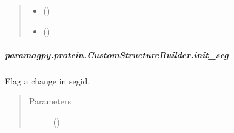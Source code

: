 \documentclass[a4paper,10pt,english,openany,oneside]{sphinxmanual}
\begin{document}
\begin{fulllineitems}
\begin{fulllineitems}
\begin{fulllineitems}
\begin{quote}
\begin{description}
\begin{itemize}
\item {} 
\sphinxAtStartPar
{} (\sphinxstyleliteralemphasis{\sphinxupquote{, }}) \textendash{} 

\item {} 
\sphinxAtStartPar
{} (\sphinxstyleliteralemphasis{\sphinxupquote{, }}) \textendash{} 

\end{itemize}

\end{description}\end{quote}

\end{fulllineitems}



\subparagraph{paramagpy.protein.CustomStructureBuilder.init\_seg}
\label{\detokenize{reference/generated/paramagpy.protein.CustomStructureBuilder.init_seg:paramagpy-protein-customstructurebuilder-init-seg}}\label{\detokenize{reference/generated/paramagpy.protein.CustomStructureBuilder.init_seg::doc}}

\begin{fulllineitems}
\label{\detokenize{reference/generated/paramagpy.protein.CustomStructureBuilder.init_seg:paramagpy.protein.CustomStructureBuilder.init_seg}}
\sphinxAtStartPar
Flag a change in segid.
\begin{quote}\begin{description}
\item[{Parameters}] \leavevmode
\sphinxAtStartPar
{} () \textendash{} 

\end{description}\end{quote}

\end{fulllineitems}




\end{fulllineitems}
\end{fulllineitems}
\end{document}
